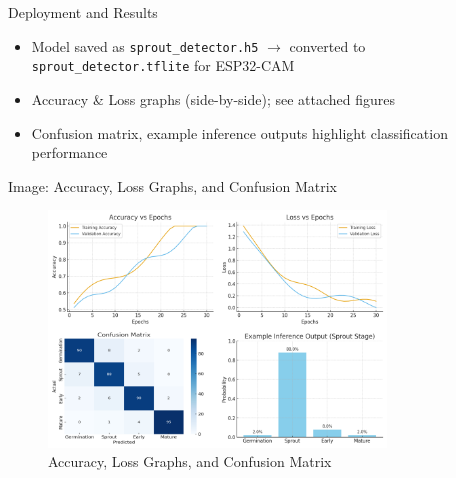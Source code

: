 \documentclass{beamer}
\begin{document}
\begin{frame}{Deployment and Results}
    \begin{itemize}
        \item Model saved as \texttt{sprout_detector.h5} $\rightarrow$ converted to \texttt{sprout_detector.tflite} for ESP32-CAM
        \item Accuracy \& Loss graphs (side-by-side); see attached figures
        \item Confusion matrix, example inference outputs highlight classification performance
    \end{itemize}
\end{frame}

\begin{frame}{Image: Accuracy, Loss Graphs, and Confusion Matrix}
    \begin{figure}
        \centering
        \includegraphics[width=0.8\textwidth]{tinyml_results_slide.png}
        \caption{Accuracy, Loss Graphs, and Confusion Matrix}
    \end{figure}
\end{frame}
\end{document}
